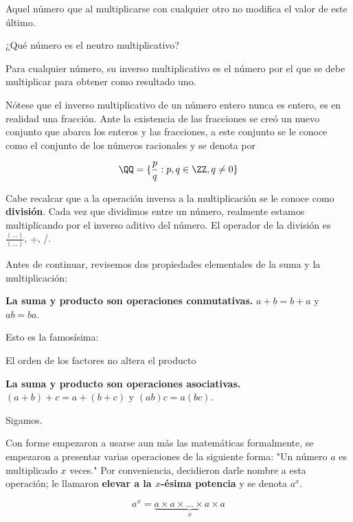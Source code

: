 \begin{definition}
    Aquel número que al multiplicarse con cualquier otro no 
    modifica el valor de este último.
\end{definition}

\begin{question}
    ¿Qué número es el neutro multiplicativo?
\end{question}

\begin{definition}
    Para cualquier número, su inverso multiplicativo es el 
    número por el que se debe multiplicar para obtener como 
    resultado uno.
\end{definition}

Nótese que el inverso multiplicativo de un número entero 
nunca es entero, es en realidad una fracción. Ante la 
existencia de las fracciones se creó un nuevo conjunto 
que abarca los enteros y las fracciones, a este conjunto 
se le conoce como el conjunto de los números racionales y 
se denota por 

\[\QQ = \{\frac{p}{q}:p,q \in \ZZ, q \neq 0\} \]

Cabe recalcar que a la operación inversa a la multiplicación se le conoce 
como \textbf{división}. Cada vez que dividimos entre un número, 
realmente estamos multiplicando por el inverso aditivo del número. 
El operador de la división es $\frac{(...)}{(...)}$, $\div$, /.

Antes de continuar, revisemos dos propiedades elementales 
de la suma y la multiplicación:

\textbf{La suma y producto son operaciones conmutativas.} 
$a+b=b+a$ y $ab=ba$.

Esto es la famosísima:

\begin{moral}
    El orden de los factores no altera el producto
\end{moral}

\textbf{La suma y producto son operaciones asociativas.} 
$(a+b)+c=a+(b+c)$ y $(ab)c=a(bc)$.

Sigamos.

Con forme empezaron a usarse aun más las matemáticas formalmente, 
se empezaron a presentar varias operaciones de la siguiente forma: 
"Un número $a$ es multiplicado $x$ veces." Por conveniencia, 
decidieron darle nombre a esta operación; le llamaron 
\textbf{elevar a la $x$-ésima potencia} y se denota $a^x$.

\[a^x=\underbrace{a\times a\times \dots \times a \times a}_x\]

